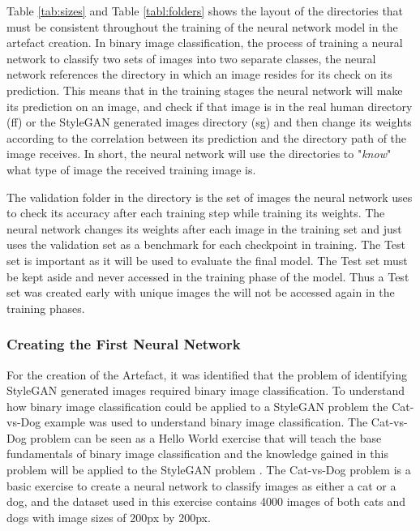 Table \ref{tab:sizes} and Table \ref{tabl:folders} shows the layout of the directories that must be consistent throughout the training of the neural network model in the artefact creation. In binary image classification, the process of training a neural network to classify two sets of images into two separate classes, the neural network references the directory in which an image resides for its check on its prediction. This means that in the training stages the neural network will make its prediction on an image, and check if that image is in the real human directory (ff) or the StyleGAN generated images directory (sg) and then change its weights according to the correlation between its prediction and the directory path of the image receives. In short, the neural network will use the directories to "\textit{know}" what type of image the received training image is. 

The validation folder in the directory is the set of images the neural network uses to check its accuracy after each training step while training its weights. The neural network changes its weights after each image in the training set and just uses the validation set as a benchmark for each checkpoint in training. The Test set is important as it will be used to evaluate the final model. The Test set must be kept aside and never accessed in the training phase of the model. Thus a Test set was created early with unique images the will not be accessed again in the training phases.

\subsubsection{Creating the First Neural Network}

For the creation of the Artefact, it was identified that the problem of identifying StyleGAN generated images required binary image classification. To understand how binary image classification could be applied to a StyleGAN problem the Cat-vs-Dog example was used to understand binary image classification. The Cat-vs-Dog problem can be seen as a Hello World exercise that will teach the base fundamentals of binary image classification and the knowledge gained in this problem will be applied to the StyleGAN problem \citep{cat2014}. The Cat-vs-Dog problem is a basic exercise to create a neural network to classify images as either a cat or a dog, and the dataset used in this exercise contains 4000 images of both cats and dogs with image sizes of 200px by 200px. 

